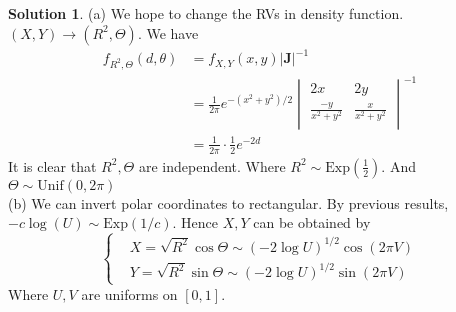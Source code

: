 \documentclass[a4paper, 10pt]{article}
\theoremstyle{definition}
\theoremstyle{hSol}
\newtheorem*{solution}{Solution}
\begin{document}
\begin{solution} (a) We hope to change the RVs in density function. $(X,Y)\to (R^2, \Theta)$. We have
\begin{equation}
  \begin{split}
    f_{R^2, \Theta}(d, \theta) &= f_{X,Y}(x,y)|\bm{J}|^{-1} \\
    &= \frac{1}{2 \pi} e^{-(x^2+y^2)/2} 
    \begin{vmatrix}
      2x & 2y \\
      \frac{-y}{x^2+y^2} & \frac{x}{x^2+y^2} \\
    \end{vmatrix}^{-1} \\
    &= \frac{1}{2\pi} \cdot \frac{1}{2}e^{-2d}
  \end{split}
\end{equation}
It is clear that $R^2, \Theta$ are independent. Where $R^2 \sim \text{Exp}(\frac{1}{2})$. And $\Theta\sim \text{Unif}(0,2\pi)$ \\
(b) We can invert polar coordinates to rectangular. By previous results, $-c\log(U)\sim\text{Exp}(1/c)$. Hence $X,Y$ can be obtained by
\begin{equation}
  \begin{cases}
    & X = \sqrt{R^2} \cos\Theta \sim (-2\log U)^{1/2} \cos (2\pi V)\\
    & Y = \sqrt{R^2} \sin\Theta \sim (-2\log U)^{1/2} \sin (2\pi V)
  \end{cases}
\end{equation}
Where $U,V$ are uniforms on $[0,1]$.
\end{solution}
\end{document}

